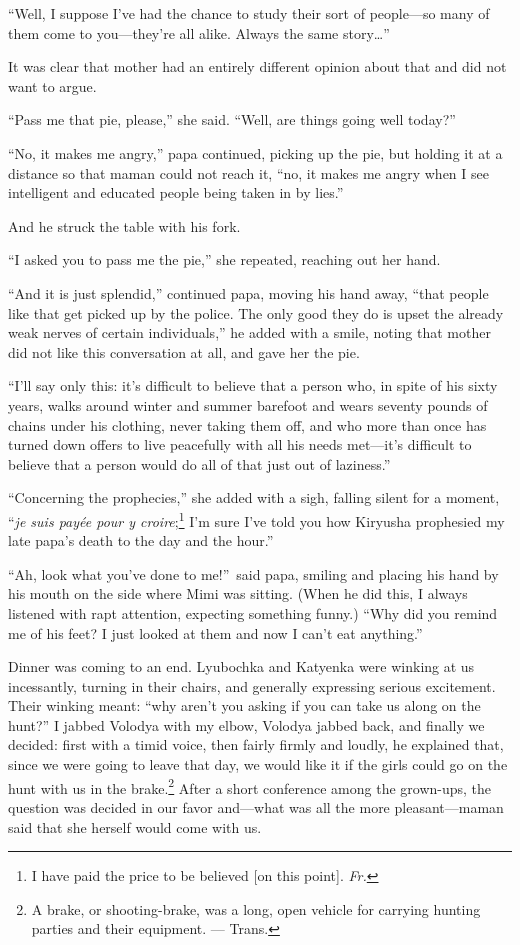 ``Well, I suppose I've had the chance to study their sort of people---so many of them come to you---they're all alike. Always the same story\ldots{}'' %

It was clear that mother had an entirely different opinion about that and did not want to argue.

``Pass me that pie, please,'' she said. ``Well, are things going well today?'' %

``No, it makes me angry,'' papa continued, picking up the pie, but holding it at a distance so that maman could not reach it, ``no, it makes me angry when I see intelligent and educated people being taken in by lies.'' %

And he struck the table with his fork.

``I asked you to pass me the pie,'' she repeated, reaching out her hand. %

``And it is just splendid,'' continued papa, moving his hand away, ``that people like that get picked up by the police. The only good they do is upset the already weak nerves of certain individuals,'' he added with a smile, noting that mother did not like this conversation at all, and gave her the pie. %

``I'll say only this: it's difficult to believe that a person who, in spite of his sixty years, walks around winter and summer barefoot and wears seventy pounds of chains under his clothing, never taking them off, and who more than once has turned down offers to live peacefully with all his needs met---it's difficult to believe that a person would do all of that just out of laziness.'' %

``Concerning the prophecies,'' she added with a sigh, falling silent for a moment, ``\textit{je suis pay\'ee pour y croire};\footnote{I have paid the price to be believed [on this point]. \textit{Fr.}} I'm sure I've told you how Kiryusha prophesied my late papa's death to the day and the hour.'' %

``Ah, look what you've done to me!''~said papa, smiling and placing his hand by his mouth on the side where Mimi was sitting. (When he did this, I always listened with rapt attention, expecting something funny.) ``Why did you remind me of his feet? I just looked at them and now I can't eat anything.'' %

Dinner was coming to an end. Lyubochka and Katyenka were winking at us incessantly, turning in their chairs, and generally expressing serious excitement. Their winking meant: ``why aren't you asking if you can take us along on the hunt?'' I jabbed Volodya with my elbow, Volodya jabbed back, and finally we decided: first with a timid voice, then fairly firmly and loudly, he explained that, since we were going to leave that day, we would like it if the girls could go on the hunt with us in the brake.\footnote{A brake, or shooting-brake, was a long, open vehicle for carrying hunting parties and their equipment. --- Trans.} After a short conference among the grown-ups, the question was decided in our favor and---what was all the more pleasant---maman said that she herself would come with us.

